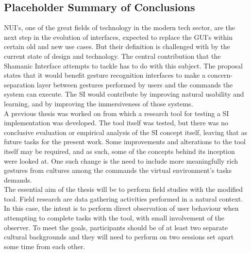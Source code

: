 \begin{dummied}
\section{Placeholder Summary of Conclusions} \label{sec:summaries}
    NUI's, one of the great fields of technology in the modern tech sector, are the next step in the evolution of interfaces, expected to replace the GUI's within certain old and new use cases. But their definition is challenged with by the current state of design and technology. The central contribution that the Shamanic Interface attempts to tackle has to do with this subject. The proposal states that it would benefit gesture recognition interfaces to make a concern-separation layer between gestures performed by users and the commands the system can execute. The SI would contribute by improving natural usability and learning, and by improving the immersiveness of those systems.\\
    A previous thesis was worked on from which a research tool for testing a SI implementation was developed. The tool itself was tested, but there was no conclusive evaluation or empirical analysis of the SI concept itself, leaving that as future tasks for the present work. Some improvements and alterations to the tool itself may be required, and as such, some of the concepts behind its inception were looked at. One such change is the need to include more meaningfully rich gestures from cultures among the commands the virtual environment’s tasks demands.\\ 
    The essential aim of the thesis will be to perform field studies with the modified tool. Field research are data gathering activities performed in a natural context. In this case, the intent is to perform direct observation of user behaviour when attempting to complete tasks with the tool, with small involvement of the observer. To meet the goals, participants should be of at least two separate cultural backgrounds and they will need to perform on two sessions set apart some time from each other.\\
\end{dummied}